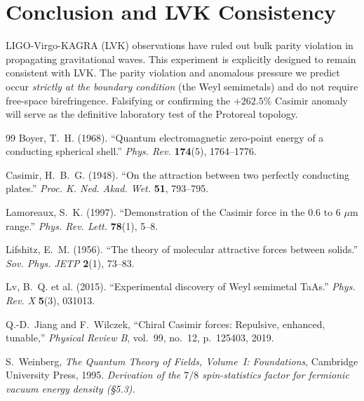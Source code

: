 \section{Conclusion and LVK Consistency}\label{sec:conclusion}
LIGO-Virgo-KAGRA (LVK) observations have ruled out bulk parity violation in propagating gravitational waves. This experiment is explicitly designed to remain consistent with LVK. The parity violation and anomalous pressure we predict occur \emph{strictly at the boundary condition} (the Weyl semimetals) and do not require free-space birefringence. Falsifying or confirming the $+262.5\%$ Casimir anomaly will serve as the definitive laboratory test of the Protoreal topology.


\vspace{2em}
\begin{thebibliography}{99}
Boyer, T.~H. (1968).
``Quantum electromagnetic zero-point energy of a conducting spherical shell.''
\textit{Phys. Rev.} \textbf{174}(5), 1764--1776.

Casimir, H.~B.~G. (1948).
``On the attraction between two perfectly conducting plates.''
\textit{Proc. K. Ned. Akad. Wet.} \textbf{51}, 793--795.

Lamoreaux, S.~K. (1997).
``Demonstration of the Casimir force in the 0.6 to 6 $\mu$m range.''
\textit{Phys. Rev. Lett.} \textbf{78}(1), 5--8.

Lifshitz, E.~M. (1956).
``The theory of molecular attractive forces between solids.''
\textit{Sov. Phys. JETP} \textbf{2}(1), 73--83.

Lv, B.~Q. et al. (2015).
``Experimental discovery of Weyl semimetal TaAs.''
\textit{Phys. Rev. X} \textbf{5}(3), 031013.

Q.-D.~Jiang and F.~Wilczek,
``Chiral Casimir forces: Repulsive, enhanced, tunable,''
\emph{Physical Review B}, vol.~99, no.~12, p.~125403, 2019.

S.~Weinberg,
\emph{The Quantum Theory of Fields, Volume~I: Foundations},
Cambridge University Press, 1995.
\textit{Derivation of the $7/8$ spin-statistics factor for fermionic vacuum energy density (\S5.3).}


\end{thebibliography}
